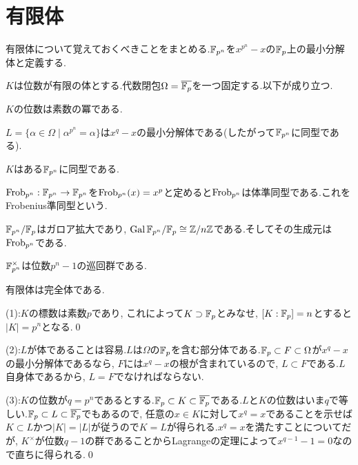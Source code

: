 \section{有限体}




有限体について覚えておくべきことをまとめる.$\mathbb{F}_{p^{n}}$を$x^{p^{n}} - x$の$\mathbb{F}_{p}$上の最小分解体と定義する.
\begin{prop}
$K$は位数が有限の体とする.代数閉包$\Omega = \overline{\mathbb{F}_{p}}$を一つ固定する.以下が成り立つ.
\ben
\item $K$の位数は素数の冪である.
\item $L = \{ \alpha\in \Omega\mid \alpha^{p^{n}} = \alpha \}$は$x^{q}-x$の最小分解体である(したがって$\mathbb{F}_{p^{n}}$に同型である).
\item $K$はある$\mathbb{F}_{p^{n}}$に同型である.
\item $\mathrm{Frob}_{p^{n}}:\mathbb{F}_{p^{n}} \to \mathbb{F}_{p^{n}}$を$\mathrm{Frob}_{p^{n}}(x) = x^{p}$と定めると$\mathrm{Frob}_{p^{n}}$は体準同型である.これをFrobenius準同型という.
\item $\mathbb{F}_{p^{n}}/\mathbb{F}_{p}$はガロア拡大であり, $\operatorname{Gal}{\mathbb{F}_{p^{n}}/\mathbb{F}_{p}}\cong \mathbb{Z}/n\mathbb{Z}$である.そしてその生成元は$\mathrm{Frob}_{p^{n}}$である.
\item $\mathbb{F}_{p^{n}}^{\times}$は位数$p^{n} - 1$の巡回群である.
\item 有限体は完全体である.
\een
\end{prop}

\prf (1):$K$の標数は素数$p$であり, これによって$K\supset \mathbb{F}_{p}$とみなせ, $[K:\mathbb{F}_{p}] = n$とすると$|K| = p^{n}$となる.\qed

(2):$L$が体であることは容易.$L$は$\Omega$の$\mathbb{F}_{p}$を含む部分体である.$\mathbb{F}_{p}\subset F\subset \Omega$が$x^{q} - x$の最小分解体であるなら, $F$には$x^{q}-x$の根が含まれているので, $L\subset F$である.$L$自身体であるから, $L=F$でなければならない.

(3):$K$の位数が$q=p^{n}$であるとする.$\mathbb{F}_{p}\subset K \subset \overline{\mathbb{F}_{p}}$である.$L$と$K$の位数はいま$q$で等しい.$\mathbb{F}_{p}\subset L\subset \overline{\mathbb{F}_{p}}$でもあるので, 任意の$x\in K$に対して$x^{q} = x$であることを示せば$K\subset L$かつ$|K| = |L|$が従うので$K=L$が得られる.$x^{q} = x$を満たすことについてだが, $K^{\times}$が位数$q-1$の群であることからLagrangeの定理によって$x^{q-1} - 1 = 0$なので直ちに得られる.\qed



